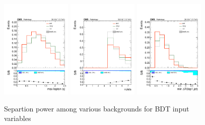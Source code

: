 \begin{figure}[htp]
\centering
\includegraphics[width=0.3\textwidth]{ch9_figs/kinMVA_input_max_Lep_eta.pdf}
\includegraphics[width=0.3\textwidth]{ch9_figs/kinMVA_input_numJets.pdf}
\includegraphics[width=0.3\textwidth]{ch9_figs/kinMVA_input_mindr_lep1_jet.pdf}

\caption[Signal extraction BDT input variables]{Separtion power among various backgrounds for BDT input variables}
\label{fig:inputs1}
\end{figure}

